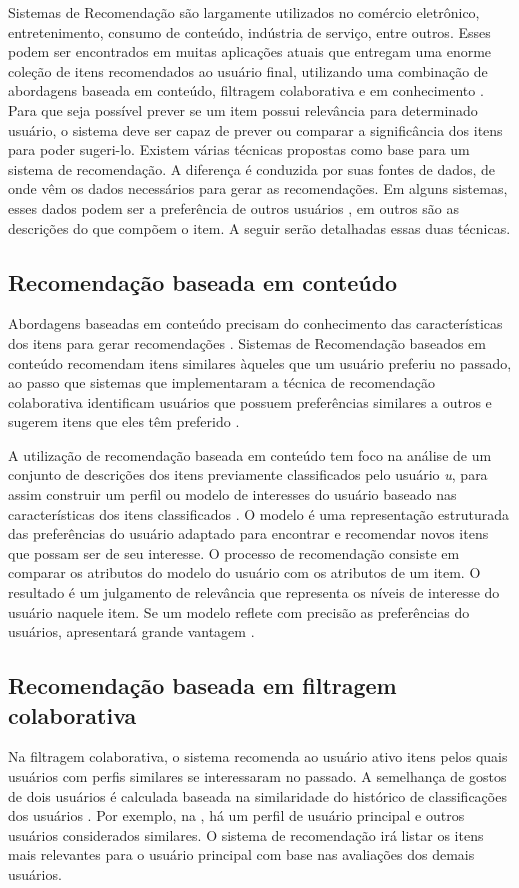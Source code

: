 \documentclass[portuguese]{textolivre}
\begin{document}
Sistemas de Recomendação são largamente utilizados no comércio eletrônico, entretenimento, consumo de conteúdo, indústria de serviço, entre outros. Esses podem ser encontrados em muitas aplicações atuais que entregam uma enorme coleção de itens recomendados ao usuário final, utilizando uma combinação de abordagens baseada em conteúdo, filtragem colaborativa e em conhecimento \cite{Ricci:2010:RSH:1941884}.
Para que seja possível prever se um item possui relevância para determinado usuário, o sistema deve ser capaz de prever ou comparar a significância dos itens para poder sugeri-lo. Existem várias técnicas propostas como base para um sistema de recomendação. A diferença é conduzida por suas fontes de dados, de onde vêm os dados necessários para gerar as recomendações. Em alguns sistemas, esses dados podem ser a preferência de outros usuários \cite{Burke2007}, em outros são as descrições do que compõem o item. A seguir serão detalhadas essas duas técnicas.


\subsection{Recomendação baseada em conteúdo}
Abordagens baseadas em conteúdo precisam do conhecimento das características dos itens para gerar recomendações \cite{bozo2016metadata}. Sistemas de Recomendação baseados em conteúdo recomendam itens similares àqueles que um usuário preferiu no passado, ao passo que sistemas que implementaram a técnica de recomendação colaborativa identificam usuários que possuem preferências similares a outros e sugerem itens que eles têm preferido \cite{Lops2011}.

A utilização de recomendação baseada em conteúdo tem foco na análise de um conjunto de descrições dos itens previamente classificados pelo usuário \textit{u}, para assim construir um perfil ou modelo de interesses do usuário baseado nas características dos itens classificados \cite{Mladenic:1999}. O modelo é uma representação estruturada das preferências do usuário adaptado para encontrar e recomendar novos itens que possam ser de seu interesse. O processo de recomendação consiste em comparar os atributos do modelo do usuário com os atributos de um item. O resultado é um julgamento de relevância que representa os níveis de interesse do usuário naquele item. Se um modelo reflete com precisão as preferências do usuários, apresentará grande vantagem \cite{Lops2011}. 

\subsection{Recomendação baseada em filtragem colaborativa}
Na filtragem colaborativa, o sistema recomenda ao usuário ativo itens pelos quais usuários com perfis similares se interessaram no passado. A semelhança de gostos de dois usuários é calculada baseada na similaridade do histórico de classificações dos usuários \cite{Ricci:2010:RSH:1941884}. Por exemplo, na , há um perfil de usuário principal e outros usuários considerados similares. O sistema de recomendação irá listar os itens mais relevantes para o usuário principal com base nas avaliações dos demais usuários. 
\end{document}
